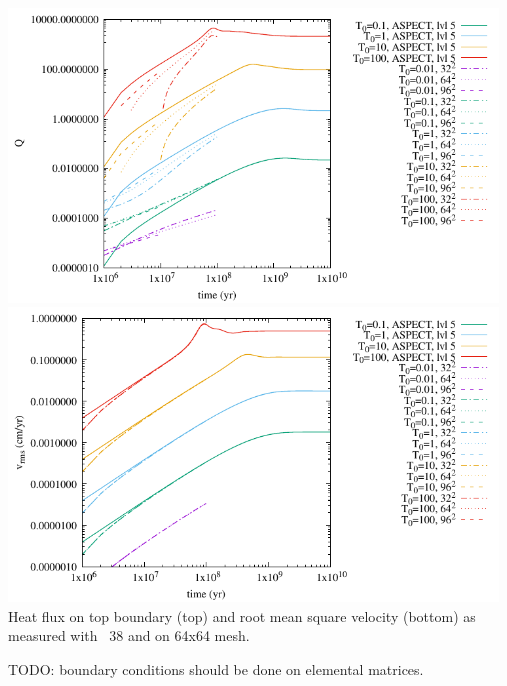 \newpage
\begin{center}
\includegraphics[width=13cm]{python_codes/fieldstone_38/results/Q.pdf}\\
\includegraphics[width=13cm]{python_codes/fieldstone_38/results/vrms.pdf}\\
{\captionfont Heat flux on top boundary (top) and root mean square velocity (bottom)
as measured with \stone~38 and \aspect on 64x64 mesh.}
\end{center}





TODO: boundary conditions should be done on elemental matrices.




